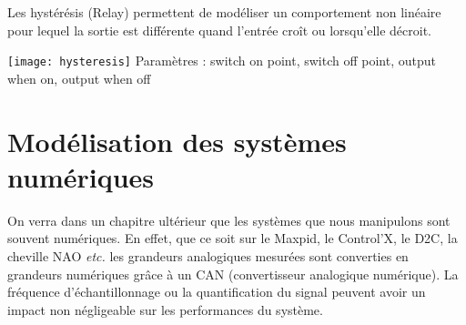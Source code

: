 \noindent \begin{minipage}[c]{.54\linewidth}
\indent Les hystérésis (Relay) permettent de modéliser un comportement non linéaire pour lequel la sortie est différente quand l'entrée croît ou lorsqu'elle décroit. 



\end{minipage}
\hfill
\begin{minipage}[c]{.18\linewidth}
\begin{center}
\texttt{[image: hysteresis]}
Paramètres : switch on point, switch off point, output when on, output when off
\end{center}
\end{minipage}
\hfill
\begin{minipage}[c]{.22\linewidth}
\begin{center}
\end{center}
\end{minipage}


\section{Modélisation des systèmes numériques}
On verra dans un chapitre ultérieur que les systèmes que nous manipulons sont souvent numériques. En effet, que ce soit sur le Maxpid, le Control'X, le D2C, la cheville NAO \textit{etc.} les grandeurs analogiques mesurées sont converties en grandeurs numériques grâce à un CAN (convertisseur analogique numérique). La fréquence d'échantillonnage ou la quantification du signal peuvent avoir un impact non négligeable sur les performances du système.



